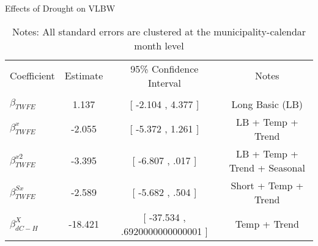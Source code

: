 \begin{table}[!ht]
\centering
\caption{Effects of Drought on VLBW}\label{tab:twfe_vlbw_test}
\renewcommand{\arraystretch}{1.5}
\fontsize{10pt}{12pt}\selectfont
\begin{tabular}{lccc}
\toprule
 \multicolumn{1}{c}{Coefficient}  &\multicolumn{1}{c}{Estimate}&\multicolumn{1}{c}{95\% Confidence Interval}&\multicolumn{1}{c}{Notes}\\\cmidrule(lr){2-2}\cmidrule(lr){3-3}\cmidrule(lr){4-4} \\
\midrule
 $ \beta_{TWFE} $ & 1.137  & [ -2.104 ,  4.377 ] & Long Basic (LB) \\
 $ \beta^{x}_{TWFE} $ & -2.055  &  [ -5.372 ,  1.261  ] & LB + Temp + Trend \\
 $ \beta^{x2}_{TWFE} $ & -3.395  & [ -6.807 ,  .017  ] & LB + Temp + Trend + Seasonal \\
 $ \beta^{Sx}_{TWFE} $ & -2.589  & [ -5.682 ,  .504  ] & Short + Temp + Trend \\
 $ \beta^{X}_{dC-H} $ & -18.421  & [ -37.534 ,  .6920000000000001 ] & Temp + Trend \\
\bottomrule
\end{tabular}
\caption*{\footnotesize{Notes: All standard errors are clustered at the municipality-calendar month level}}
\end{table}
